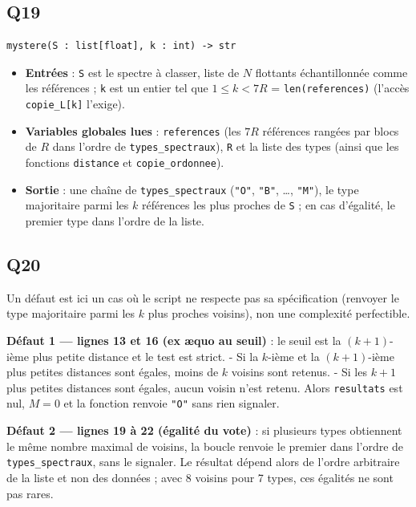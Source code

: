\documentclass[11pt,a4paper]{article}
\providecommand{\tightlist}{\setlength{\itemsep}{0pt}\setlength{\parskip}{0pt}}
\begin{document}
\hypertarget{q19}{%
\subsection{Q19}\label{q19}}

\begin{lstlisting}
mystere(S : list[float], k : int) -> str
\end{lstlisting}

\begin{itemize}
\tightlist
\item
  \textbf{Entrées} : \texttt{S} est le spectre à classer, liste de \(N\) flottants échantillonnée comme les références ; \texttt{k} est un entier tel que \(1 \leqslant k < 7R\) = \texttt{len(references)} (l'accès \texttt{copie\_L{[}k{]}} l'exige).
\item
  \textbf{Variables globales lues} : \texttt{references} (les \(7R\) références rangées par blocs de \(R\) dans l'ordre de \texttt{types\_spectraux}), \texttt{R} et la liste des types (ainsi que les fonctions \texttt{distance} et \texttt{copie\_ordonnee}).
\item
  \textbf{Sortie} : une chaîne de \texttt{types\_spectraux} (\texttt{"O"}, \texttt{"B"}, \ldots, \texttt{"M"}), le type majoritaire parmi les \(k\) références les plus proches de \texttt{S} ; en cas d'égalité, le premier type dans l'ordre de la liste.
\end{itemize}

\hypertarget{q20}{%
\subsection{Q20}\label{q20}}

Un défaut est ici un cas où le script ne respecte pas sa spécification (renvoyer le type majoritaire parmi les \(k\) plus proches voisins), non une complexité perfectible.

\textbf{Défaut 1 --- lignes 13 et 16 (ex æquo au seuil)} : le seuil est la \((k+1)\)-ième plus petite distance et le test est strict.
- Si la \(k\)-ième et la \((k+1)\)-ième plus petites distances sont égales, moins de \(k\) voisins sont retenus.
- Si les \(k+1\) plus petites distances sont égales, aucun voisin n'est retenu. Alors \texttt{resultats} est nul, \(M = 0\) et la fonction renvoie \texttt{"O"} sans rien signaler.

\textbf{Défaut 2 --- lignes 19 à 22 (égalité du vote)} : si plusieurs types obtiennent le même nombre maximal de voisins, la boucle renvoie le premier dans l'ordre de \texttt{types\_spectraux}, sans le signaler. Le résultat dépend alors de l'ordre arbitraire de la liste et non des données ; avec 8 voisins pour 7 types, ces égalités ne sont pas rares.
\end{document}
